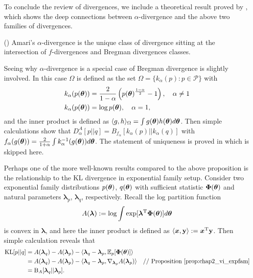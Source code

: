 To conclude the review of divergences, we include a theoretical result proved by \cite{amari:divergence2009}, which shows the deep connections between $\alpha$-divergence and the above two families of divergences.
%
\begin{prop}
(\citep{amari:divergence2009}) 
Amari's $\alpha$-divergence is the unique class of divergence sitting at the intersection of $f$-divergences and Bregman divergences classes.
\end{prop}
%
Seeing why $\alpha$-divergence is a special case of Bregman divergence is slightly involved. In this case $\Omega$ is defined as the set $\Omega = \{ k_{\alpha}(p): p \in \mathcal{P} \}$ with\begin{equation*}
\begin{aligned}
k_{\alpha}(p(\bm{\theta})) &= \frac{2}{1 - \alpha} \left( p(\bm{\theta})^{\frac{1 - \alpha}{2}} - 1 \right), \quad \alpha \neq 1 \\
k_{\alpha}(p(\bm{\theta})) &= \log p(\bm{\theta}), \quad \alpha = 1,
\end{aligned} 
\end{equation*}
and the inner product is defined as $\langle g, h \rangle_{\Omega} = \int g(\bm{\theta}) h(\bm{\theta}) d\bm{\theta}$. Then simple calculations show that $D_{\alpha}^A[p||q] = B_{f_{\alpha}}[k_{\alpha}(p) || k_{\alpha}(q)]$ with $f_{\alpha}(g(\bm{\theta})) = \frac{2}{1 + \alpha} \int k_{\alpha}^{-1}(g(\bm{\theta})) d\bm{\theta}$. The statement of uniqueness is proved in \citet{amari:divergence2009} which is skipped here.

Perhaps one of the more well-known results compared to the above proposition is the relationship to the KL divergence in exponential family setup. Consider two exponential family distributions $p(\bm{\theta})$, $q(\bm{\theta})$ with sufficient statistic $\bm{\Phi}(\bm{\theta})$ and natural parameters $\bm{\lambda}_p$, $\bm{\lambda}_q$, respectively. Recall the log partition function
$$ A(\bm{\lambda}) := \log \int \exp[\bm{\lambda}^{\text{T}} \bm{\Phi}(\bm{\theta}) ] d\bm{\theta}$$
is convex in $\bm{\lambda}$, and here the inner product is defined as $\langle \bm{x}, \mathbf{y} \rangle := \bm{x}^{\text{T}} \mathbf{y}$. Then simple calculation reveals that
\begin{equation}
\begin{aligned}
\mathrm{KL}[p || q] &= A(\bm{\lambda}_q) - A(\bm{\lambda}_p) - \langle \bm{\lambda}_q - \bm{\lambda}_p, \mathbb{E}_p[\bm{\Phi}(\bm{\theta})] \rangle \\
&= A(\bm{\lambda}_q) - A(\bm{\lambda}_p) - \langle \bm{\lambda}_q - \bm{\lambda}_p, \nabla_{\bm{\lambda}_p} A(\bm{\lambda}_p) \rangle \quad \text{// Proposition \ref{prop:chap2_vi_expfam}} \\
&= \mathrm{B}_{A}[\bm{\lambda}_q || \bm{\lambda}_p].
\end{aligned}
\end{equation}
